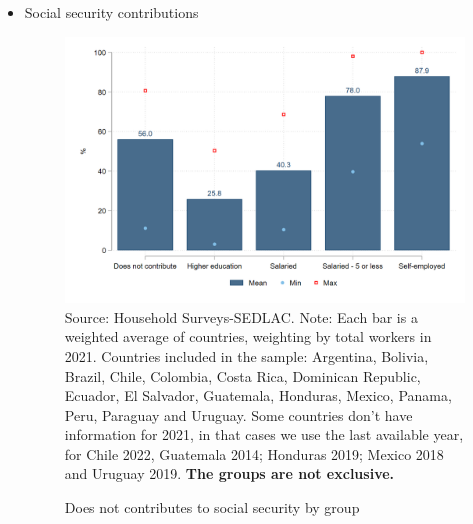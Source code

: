 \documentclass[english]{article}
\begin{document}
\begin{itemize}
        
 \item Social security contributions
    \begin{itemize}
        \begin{figure}[!htb]
        \justifying
        \caption{Does not contributes to social security by group}     
        \includegraphics[scale=.3]{latex/figures/Snapshot/Social security contributions.png}
        \label{fig:SScontributions}
        \footnotesize{Source: Household Surveys-SEDLAC.}
        \footnotesize{Note: Each bar is a weighted average of countries, weighting by total workers in 2021. Countries included in the sample: Argentina, Bolivia, Brazil, Chile, Colombia, Costa Rica, Dominican Republic, Ecuador, El Salvador, Guatemala, Honduras, Mexico, Panama, Peru, Paraguay and Uruguay. Some countries don’t have information for 2021, in that cases we use the last available year, for Chile 2022, Guatemala 2014; Honduras 2019; Mexico 2018 and Uruguay 2019. \textbf{The groups are not exclusive.}}
        \end{figure}



\end{itemize}
\end{itemize}
\end{document}

